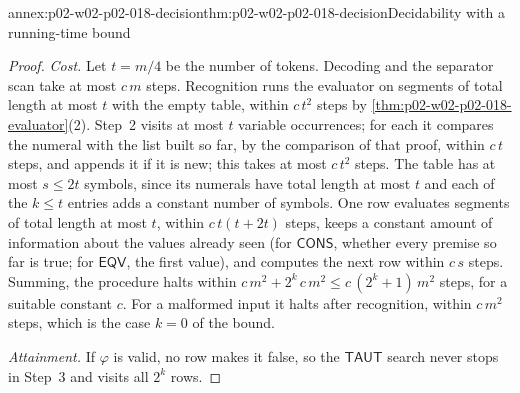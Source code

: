\begin{annexitem}{annex:p02-w02-p02-018-decision}{thm:p02-w02-p02-018-decision}{Decidability with a running-time bound}
\begin{proof}
\emph{Cost.}  Let \(t=m/4\) be the number of tokens.  Decoding and the
separator scan take at most \(c\,m\) steps.  Recognition runs the evaluator on
segments of total length at most \(t\) with the empty table, within
\(c\,t^2\) steps by \cref{thm:p02-w02-p02-018-evaluator}(2).  Step~2 visits at
most \(t\) variable occurrences; for each it compares the numeral with the
list built so far, by the comparison of that proof, within \(c\,t\) steps,
and appends it if it is new; this takes at most \(c\,t^2\) steps.  The table
has at most \(s\leq2t\) symbols, since its numerals have total length at most
\(t\) and each of the \(k\leq t\) entries adds a constant number of symbols.
One row evaluates segments of total length at most \(t\), within
\(c\,t(t+2t)\) steps, keeps a constant amount of information about the values
already seen (for \(\mathsf{CONS}\), whether every premise so far is true; for
\(\mathsf{EQV}\), the first value), and computes the next row within
\(c\,s\) steps.  Summing, the procedure halts within
\(c\,m^2+2^k\,c\,m^2\leq c\,(2^k+1)\,m^2\) steps, for a suitable constant
\(c\).  For a malformed input it halts after recognition, within \(c\,m^2\)
steps, which is the case \(k=0\) of the bound.

\emph{Attainment.}  If \(\varphi\) is valid, no row makes it false, so the
\(\mathsf{TAUT}\) search never stops in Step~3 and visits all \(2^k\) rows.
\end{proof}
\end{annexitem}

